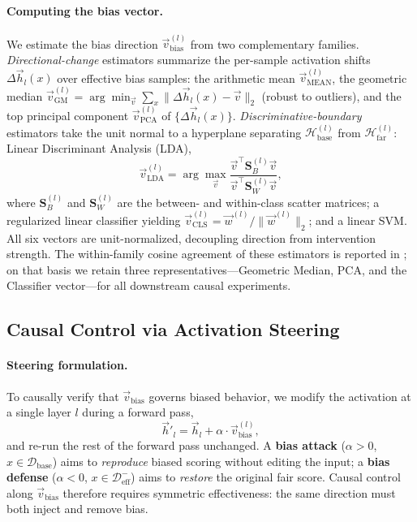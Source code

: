 \documentclass[11pt]{article}
\let\Cref\crtCref
\begin{document}
\paragraph{Computing the bias vector.}
We estimate the bias direction $\vec{v}_{\text{bias}}^{(l)}$ from two complementary families. \emph{Directional-change} estimators summarize the per-sample activation shifts $\Delta \vec{h}_l(x)$ over effective bias samples: the arithmetic mean $\vec{v}_{\text{MEAN}}^{(l)}$, the geometric median $\vec{v}_{\text{GM}}^{(l)} = \arg\min_{\vec{v}} \sum_x \|\Delta \vec{h}_l(x) - \vec{v}\|_2$ (robust to outliers), and the top principal component $\vec{v}_{\text{PCA}}^{(l)}$ of $\{\Delta \vec{h}_l(x)\}$. \emph{Discriminative-boundary} estimators take the unit normal to a hyperplane separating $\mathcal{H}_{\text{base}}^{(l)}$ from $\mathcal{H}_{\text{far}}^{(l)}$: Linear Discriminant Analysis (LDA),
\begin{equation}
    \vec{v}_{\text{LDA}}^{(l)} = \arg\max_{\vec{v}} \frac{\vec{v}^{\top} \mathbf{S}_B^{(l)} \vec{v}}{\vec{v}^{\top} \mathbf{S}_W^{(l)} \vec{v}},
\end{equation}
where $\mathbf{S}_B^{(l)}$ and $\mathbf{S}_W^{(l)}$ are the between- and within-class scatter matrices; a regularized linear classifier yielding $\vec{v}_{\text{CLS}}^{(l)} = \vec{w}^{(l)}/\|\vec{w}^{(l)}\|_2$; and a linear SVM. All six vectors are unit-normalized, decoupling direction from intervention strength. The within-family cosine agreement of these estimators is reported in \Cref{tab:vector_cosine}; on that basis we retain three representatives---Geometric Median, PCA, and the Classifier vector---for all downstream causal experiments.


\subsection{Causal Control via Activation Steering}
\label{subsec:causal_method}

\paragraph{Steering formulation.}
To causally verify that $\vec{v}_{\text{bias}}$ governs biased behavior, we modify the activation at a single layer $l$ during a forward pass,
\begin{equation}
    \vec{h}'_l = \vec{h}_l + \alpha \cdot \vec{v}_{\text{bias}}^{(l)},
    \label{eq:steer}
\end{equation}
and re-run the rest of the forward pass unchanged. A \textbf{bias attack} ($\alpha > 0$, $x \in \mathcal{D}_{\text{base}}$) aims to \emph{reproduce} biased scoring without editing the input; a \textbf{bias defense} ($\alpha < 0$, $x \in \mathcal{D}_{\text{eff}}^{-}$) aims to \emph{restore} the original fair score. Causal control along $\vec{v}_{\text{bias}}$ therefore requires symmetric effectiveness: the same direction must both inject and remove bias.
\end{document}
